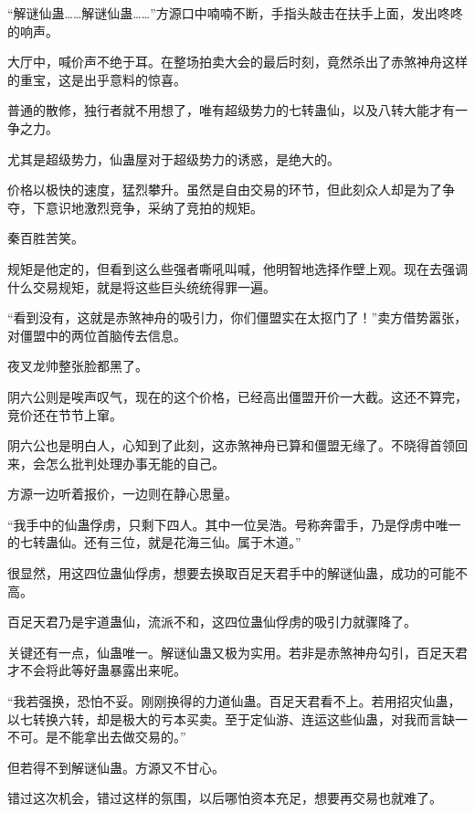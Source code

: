 
\begin{this_body}



“解谜仙蛊……解谜仙蛊……”方源口中喃喃不断，手指头敲击在扶手上面，发出咚咚的响声。

大厅中，喊价声不绝于耳。在整场拍卖大会的最后时刻，竟然杀出了赤煞神舟这样的重宝，这是出乎意料的惊喜。

普通的散修，独行者就不用想了，唯有超级势力的七转蛊仙，以及八转大能才有一争之力。

尤其是超级势力，仙蛊屋对于超级势力的诱惑，是绝大的。

价格以极快的速度，猛烈攀升。虽然是自由交易的环节，但此刻众人却是为了争夺，下意识地激烈竞争，采纳了竞拍的规矩。

秦百胜苦笑。

规矩是他定的，但看到这么些强者嘶吼叫喊，他明智地选择作壁上观。现在去强调什么交易规矩，就是将这些巨头统统得罪一遍。

“看到没有，这就是赤煞神舟的吸引力，你们僵盟实在太抠门了！”卖方借势嚣张，对僵盟中的两位首脑传去信息。

夜叉龙帅整张脸都黑了。

阴六公则是唉声叹气，现在的这个价格，已经高出僵盟开价一大截。这还不算完，竞价还在节节上窜。

阴六公也是明白人，心知到了此刻，这赤煞神舟已算和僵盟无缘了。不晓得首领回来，会怎么批判处理办事无能的自己。

方源一边听着报价，一边则在静心思量。

“我手中的仙蛊俘虏，只剩下四人。其中一位吴浩。号称奔雷手，乃是俘虏中唯一的七转蛊仙。还有三位，就是花海三仙。属于木道。”

很显然，用这四位蛊仙俘虏，想要去换取百足天君手中的解谜仙蛊，成功的可能不高。

百足天君乃是宇道蛊仙，流派不和，这四位蛊仙俘虏的吸引力就骤降了。

关键还有一点，仙蛊唯一。解谜仙蛊又极为实用。若非是赤煞神舟勾引，百足天君才不会将此等好蛊暴露出来呢。

“我若强换，恐怕不妥。刚刚换得的力道仙蛊。百足天君看不上。若用招灾仙蛊，以七转换六转，却是极大的亏本买卖。至于定仙游、连运这些仙蛊，对我而言缺一不可。是不能拿出去做交易的。”

但若得不到解谜仙蛊。方源又不甘心。

错过这次机会，错过这样的氛围，以后哪怕资本充足，想要再交易也就难了。


\end{this_body}
